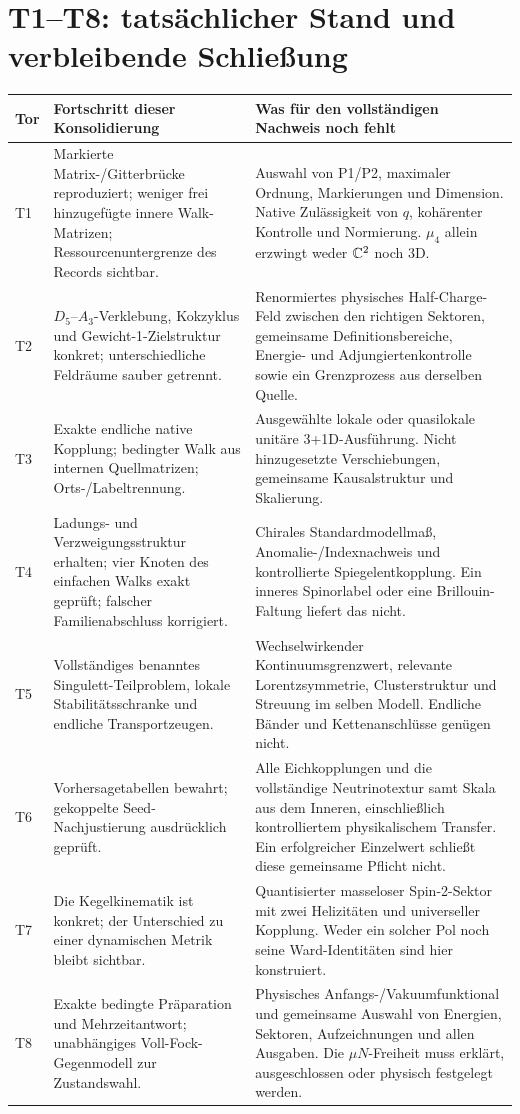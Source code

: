 \section{T1--T8: tatsächlicher Stand und verbleibende Schließung}
\begin{longtable}{L{8mm}L{53mm}L{89mm}}
\toprule
\textbf{Tor}&\textbf{Fortschritt dieser Konsolidierung}&\textbf{Was für den vollständigen Nachweis noch fehlt}\\\midrule\endhead
T1&Markierte Matrix-/Gitterbrücke reproduziert; weniger frei hinzugefügte innere Walk-Matrizen; Ressourcenuntergrenze des Records sichtbar.&Auswahl von P1/P2, maximaler Ordnung, Markierungen und Dimension. Native Zulässigkeit von $q$, kohärenter Kontrolle und Normierung. $\mu_4$ allein erzwingt weder $\mathbb C^2$ noch 3D.\\
T2&$D_5$--$A_3$-Verklebung, Kokzyklus und Gewicht-1-Zielstruktur konkret; unterschiedliche Feldräume sauber getrennt.&Renormiertes physisches Half-Charge-Feld zwischen den richtigen Sektoren, gemeinsame Definitionsbereiche, Energie- und Adjungiertenkontrolle sowie ein Grenzprozess aus derselben Quelle.\\
T3&Exakte endliche native Kopplung; bedingter Walk aus internen Quellmatrizen; Orts-/Labeltrennung.&Ausgewählte lokale oder quasilokale unitäre 3+1D-Ausführung. Nicht hinzugesetzte Verschiebungen, gemeinsame Kausalstruktur und Skalierung.\\
T4&Ladungs- und Verzweigungsstruktur erhalten; vier Knoten des einfachen Walks exakt geprüft; falscher Familienabschluss korrigiert.&Chirales Standardmodellmaß, Anomalie-/Indexnachweis und kontrollierte Spiegelentkopplung. Ein inneres Spinorlabel oder eine Brillouin-Faltung liefert das nicht.\\
T5&Vollständiges benanntes Singulett-Teilproblem, lokale Stabilitätsschranke und endliche Transportzeugen.&Wechselwirkender Kontinuumsgrenzwert, relevante Lorentzsymmetrie, Clusterstruktur und Streuung im selben Modell. Endliche Bänder und Kettenanschlüsse genügen nicht.\\
T6&Vorhersagetabellen bewahrt; gekoppelte Seed-Nachjustierung ausdrücklich geprüft.&Alle Eichkopplungen und die vollständige Neutrinotextur samt Skala aus dem Inneren, einschließlich kontrolliertem physikalischem Transfer. Ein erfolgreicher Einzelwert schließt diese gemeinsame Pflicht nicht.\\
T7&Die Kegelkinematik ist konkret; der Unterschied zu einer dynamischen Metrik bleibt sichtbar.&Quantisierter masseloser Spin-2-Sektor mit zwei Helizitäten und universeller Kopplung. Weder ein solcher Pol noch seine Ward-Identitäten sind hier konstruiert.\\
T8&Exakte bedingte Präparation und Mehrzeitantwort; unabhängiges Voll-Fock-Gegenmodell zur Zustandswahl.&Physisches Anfangs-/Vakuumfunktional und gemeinsame Auswahl von Energien, Sektoren, Aufzeichnungen und allen Ausgaben. Die $\mu N$-Freiheit muss erklärt, ausgeschlossen oder physisch festgelegt werden.\\\bottomrule
\end{longtable}
